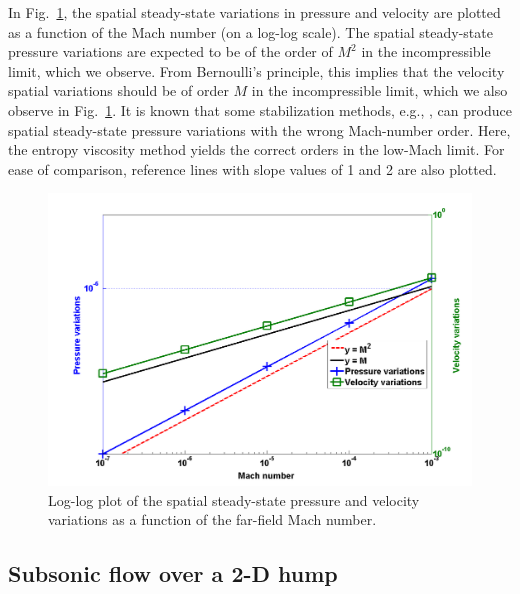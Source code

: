 \documentclass[review,10pt]{elsarticle}
\newcommand{\fig}[1]{Fig.~\ref{#1}}                      %
\newcommand{\tcr}[1]{\textcolor{red}{#1}}
\newcommand{\tcb}[1]{\textcolor{blue}{#1}}
\begin{document}
%
In \fig{fig:pressure_vel_fluc}, the spatial steady-state variations in pressure and velocity are plotted as a function of the 
Mach number (on a log-log scale). The spatial steady-state pressure variations are expected to be of the order of $M^2$ in the incompressible limit, 
which we observe. From Bernoulli's principle, this implies that the velocity spatial variations should be of order $M$ 
in the incompressible limit, which we also observe in \fig{fig:pressure_vel_fluc}. 
It is known that some stabilization methods, e.g., \cite{LowMach1, LowMach2, LowMach3}, 
can produce spatial steady-state pressure variations with the wrong Mach-number order. Here, the entropy viscosity method yields 
the correct orders in the low-Mach limit. For ease of comparison, reference lines with slope values of 1 and 2 are also plotted.
%
\begin{figure}[H]
\centering
\includegraphics[width=\textwidth]{figures/pressure_fluctuation.png}
\caption{Log-log plot of the spatial steady-state pressure and velocity variations as a function of the far-field Mach number.}
\label{fig:pressure_vel_fluc}
\end{figure}

\subsection{Subsonic flow over a 2-D hump} \label{sec:hump}
\end{document}
